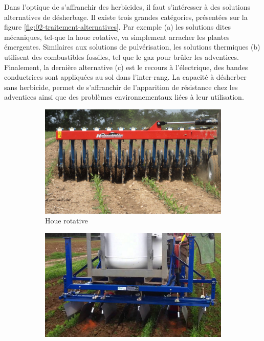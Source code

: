 \documentclass[../thesis.tex]{subfiles}
\begin{document}
    Dans l'optique de s'affranchir des herbicides, il faut s'intéresser à des solutions alternatives de désherbage. Il existe trois grandes catégories, présentées sur la figure \ref{fig:02-traitement-alternatives}. Par exemple (a) les solutions dites mécaniques, tel-que la houe rotative, va simplement arracher les plantes émergentes. Similaires aux solutions de pulvérisation, les solutions thermiques (b) utilisent des combustibles fossiles, tel que le gaz pour brûler les adventices. Finalement, la dernière alternative (c) est le recours à l'électrique, des bandes conductrices sont appliquées au sol dans l'inter-rang. La capacité à désherber sans herbicide, permet de s'affranchir de l'apparition de résistance chez les adventices ainsi que des problèmes environnementaux liées à leur utilisation.
    
    
    \begin{figure}[H]
        \centering
        \begin{subfigure}{0.31\linewidth}
            \centering
            \includegraphics[width=\linewidth]{img/intro/traitement-houe-rotative}
            \caption{Houe rotative}
        \end{subfigure}
        \hfill
        \begin{subfigure}{0.31\linewidth}
            \centering
            \includegraphics[width=\linewidth]{img/intro/traitement-thermique}

\end{subfigure}
\end{figure}
\end{document}
